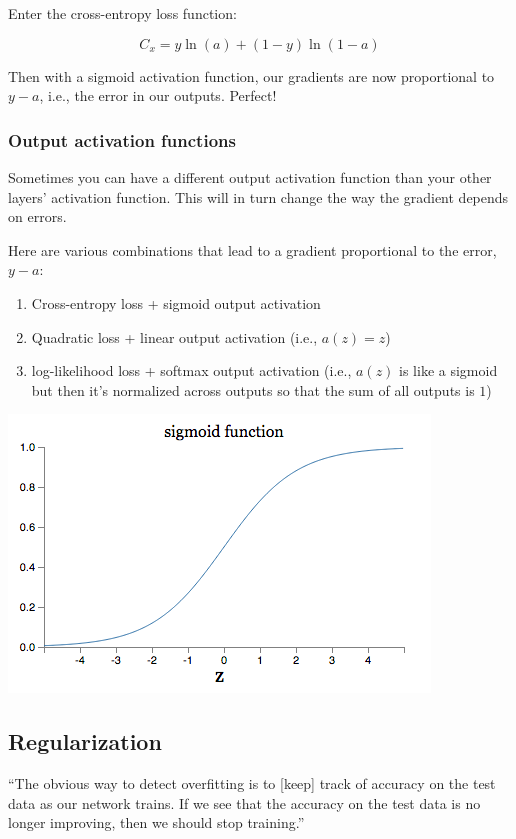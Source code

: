 \documentclass[12pt]{article}
\begin{document}
Enter the cross-entropy loss function:

$$ C_x = y\ln(a) + (1-y)\ln(1-a) $$

Then with a sigmoid activation function, our gradients are now proportional to $y - a$, i.e., the error in our outputs. Perfect!


\subsubsection*{Output activation functions}

Sometimes you can have a different output activation function than your other layers' activation function. This will in turn change the way the gradient depends on errors.

Here are various combinations that lead to a gradient proportional to the error, $y - a$:

\begin{enumerate}

\item Cross-entropy loss + sigmoid output activation
\item Quadratic loss + linear output activation (i.e., $a(z) = z$)
\item log-likelihood loss + softmax output activation (i.e., $a(z)$ is like a sigmoid but then it's normalized across outputs so that the sum of all outputs is $1$)

\end{enumerate}


\includegraphics[scale=0.5]{sigmoid}


\subsection*{Regularization}

``The obvious way to detect overfitting is to [keep] track of accuracy on the test data as our network trains. If we see that the accuracy on the test data is no longer improving, then we should stop training.''
\end{document}
